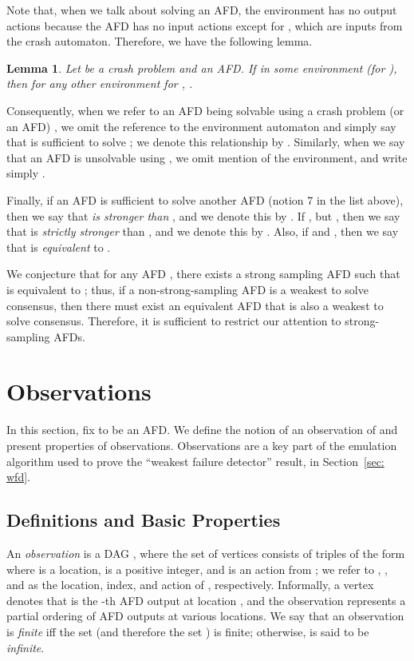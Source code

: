 \documentclass[11pt]{article}
\numberwithin{theorem}{section}
\newtheorem{lemma}[theorem]{Lemma}
\begin{document}
Note that, when we talk about solving an AFD, the environment
 has no output actions because the AFD has no input
actions except for , which are inputs from the crash
automaton. 
Therefore, we have the following lemma.

\begin{lemma}
Let  be a crash problem and  an AFD.
If  in some environment 
(for ), then for any other environment  for ,
. 
\end{lemma}

Consequently, when we refer to an AFD  being solvable using a crash
problem (or an AFD) , we omit the reference to the environment
automaton and simply say that  is sufficient to solve ; we
denote this relationship by . 
Similarly, when we say that an AFD  is unsolvable using , we
omit mention of the environment, and write simply .

Finally, if an AFD  is sufficient to solve another AFD  (notion 7 in the list above), then
we say that  \emph{is stronger than} , and we denote this
by . 
If , but , then we
say that  is \emph{strictly stronger} than , and we denote this
by . Also, if   and , then we say that  is \emph{equivalent} to .

We conjecture that for any AFD , there exists a strong sampling AFD  such that  is equivalent to ; thus, if a non-strong-sampling AFD  is a weakest to solve consensus, then there must exist an equivalent AFD  that is also a weakest to solve consensus. Therefore, it is sufficient to restrict our attention to strong-sampling AFDs.



\section{Observations}\label{sec:observations}



In this section, fix  to be an AFD.
We define the notion of an observation  of  and present
properties of observations.
Observations are a key part of the emulation algorithm used to prove
the ``weakest failure detector'' result, in Section~\ref{sec: wfd}.



\subsection{Definitions and Basic Properties}
\label{subsec:observationDef}

An \emph{observation} is a DAG , where the set  of
vertices consists of triples of the form  where  is a location,  is a positive integer, and  is an action
from ; we refer to , , and  as the location, index,
and action of , respectively. 
Informally, a vertex  denotes that  is the -th AFD
output at location , and the observation represents a partial
ordering of AFD outputs at various locations. 
We say that an observation  is \emph{finite} iff the set  (and therefore the set ) is finite; otherwise,  is said to be \emph{infinite}.
\end{document}
